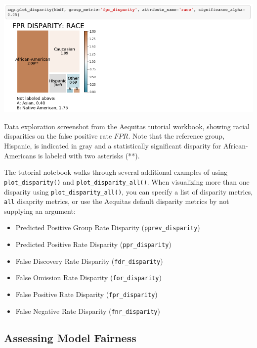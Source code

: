 \documentclass[]{krantz}
\begin{document}
\begin{center}\includegraphics[width=1\linewidth]{ChapterBias/figures/tutorial_plot_disparity} \end{center}

Data exploration screenshot from the Aequitas tutorial workbook, showing
racial disparities on the false positive rate \(FPR\). Note that the
reference group, Hispanic, is indicated in gray and a statistically
significant disparity for African-Americans is labeled with two
asterisks (**).

The tutorial notebook walks through several additional examples of using
\texttt{plot\_disparity()} and \texttt{plot\_disparity\_all()}. When
visualizing more than one disparity using
\texttt{plot\_disparity\_all()}, you can specify a list of disparity
metrics, \texttt{\textquotesingle{}all\textquotesingle{}} disaprity
metrics, or use the Aequitas default disparity metrics by not supplying
an argument:

\begin{itemize}
\item
  Predicted Positive Group Rate Disparity (\texttt{pprev\_disparity})
\item
  Predicted Positive Rate Disparity (\texttt{ppr\_disparity})
\item
  False Discovery Rate Disparity (\texttt{fdr\_disparity})
\item
  False Omission Rate Disparity (\texttt{for\_disparity})
\item
  False Positive Rate Disparity (\texttt{fpr\_disparity})
\item
  False Negative Rate Disparity (\texttt{fnr\_disparity})
\end{itemize}

\subsection{Assessing Model Fairness}\label{assessing-model-fairness}
\end{document}

